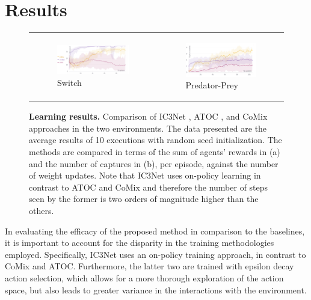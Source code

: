 \documentclass[a4paper,singleside,12pt]{report} %
\begin{document}
\section{Results}\label{results}

\begin{figure}
  \hspace*{-1.6cm}
  \centering
  \begin{tabular}{p{8cm} p{7cm}}
  \begin{subfigure}[b]{10cm}
      \caption{Switch}
      \includegraphics[width=8.5cm]{images/train_switch.png}
  \end{subfigure} &
  \begin{subfigure}[b]{7cm}
      \caption{Predator-Prey}
      \includegraphics[width=7cm]{images/train_pursuit.png}
  \end{subfigure} \\
  \end{tabular}
  \caption{\textbf{Learning results.} Comparison of IC3Net \cite{IC3NETSingh2018LearningWT}, ATOC \cite{ATOCJiang2018LearningAC}, and CoMix approaches in the two environments. The data presented are the average results of 10 executions with random seed initialization. The methods are compared in terms of the sum of agents' rewards in (a) and the number of captures in (b), per episode, against the number of weight updates. Note that IC3Net uses on-policy learning in contrast to ATOC and CoMix and therefore the number of steps seen by the former is two orders of magnitude higher than the others.}
  \label{fig:training-res}
\end{figure}


In evaluating the efficacy of the proposed method in comparison to the baselines, it is important to account for the disparity in the training methodologies employed. Specifically, IC3Net uses an on-policy training approach, in contrast to CoMix and ATOC. Furthermore, the latter two are trained with epsilon decay action selection, which allows for a more thorough exploration of the action space, but also leads to greater variance in the interactions with the environment.
\end{document}
